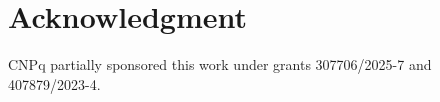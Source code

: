 \documentclass[journal]{IEEEtran}
\begin{document}
\section*{Acknowledgment}
CNPq partially sponsored this work under grants 307706/2025-7 and 407879/2023-4.



\end{document}
